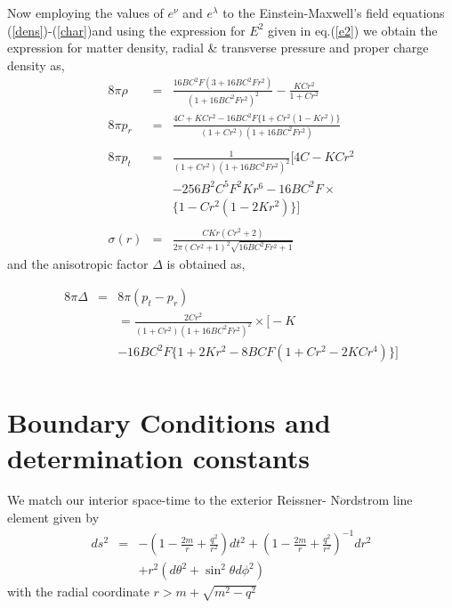 \documentclass[preprintnumbers,amsmath,amssymb,floatfix,9pt,prd,twocolumn,
superscriptaddress,nofootinbib]{revtex4}
\begin{document}
Now employing the values of $e^{\nu}$ and $e^{\lambda}$ to the Einstein-Maxwell's field equations (\ref{dens})-(\ref{char})and using the expression for $E^2$ given in eq.(\ref{e2}) we obtain the expression for matter density, radial \& transverse pressure and proper charge density as,
\begin{eqnarray}
8\pi\rho &=& \frac{16 B C^{2} F (3 + 16 B C^2 F r^2)}{(1 + 16 B C^2 F r^2)^2}-\frac{K C r^2}{1 + C r^2} \label{r1}\\
8\pi p_r &=& \frac{4C + K C r^2 - 16 B C^2 F \{1 + C r^2 (1 - K r^2)\}}{(1 + C r^2) (1 + 16 B C^2 F r^2)}\nonumber\\
\\
8\pi p_t &=& \frac{1}{(1 + C r^2) (1 + 16 B C^2 F r^2)^2}\Big[4C - K Cr^2 \nonumber\\
&&- 256 B^2 C^5 F^2 K r^6 -
16 B C^2 F \times\\
&&\{1 - C r^2 (1-2 K r^2)\}\Big] \nonumber\\\label{r2}\\
\sigma(r) &=& \frac{C K r (Cr^2+2)}{2 \pi  (C r^2+1)^2 \sqrt{16 B C^2 F r^2+1}} \label{r3}
\end{eqnarray}
and the anisotropic factor $\Delta$ is obtained as,

\begin{eqnarray}
8\pi \Delta &=& 8\pi(p_t-p_r)\nonumber\\
&&= \frac{2 C r^2} {(1 + C r^2) (1 + 16 B C^2 F r^2)^2}\times \big[-K \nonumber\\&&-
   16 B C^2 F \{1 + 2 K r^2 - 8 B C F
   (1 + C r^2- 2 K C r^4)\}\big] \nonumber\\\label{r4}
\end{eqnarray}


\section{Boundary Conditions and determination constants}

We match our interior space-time to the exterior Reissner- N$\ddot{o}$rdstrom line element given by
\begin{eqnarray}
ds^{2}&=&-\left(1-\frac{2m}{r}+\frac{q^2}{r^{2}}\right)dt^{2}+\left(1-\frac{2m}{r}+\frac{q^2}{r^{2}}\right)^{-1}dr^{2}\nonumber\\
&&+r^{2}(d\theta^{2}+\sin^{2}\theta d\phi^{2})
\end{eqnarray}
with the radial coordinate $r>m+\sqrt{m^{2}-q^2}$ \\
\end{document}
